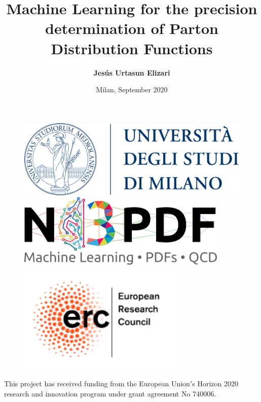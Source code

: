 \documentclass[aspectratio=43]{beamer}
\title[GP for theory uncertainties]{Machine Learning for the precision determination of Parton Distribution Functions}
\author{\textbf {Jes\'us Urtasun Elizari}}
\date{Milan, September 2020}
\begin{document}
\begin{frame}

	\vspace{1.0 cm}
	
	
	\vspace{0.25 cm}

	\begin{figure}
		\includegraphics[width = 3.0 cm]{plots/unimi.png}
		\hfill
		\includegraphics[width = 3.0 cm]{plots/n3pdf.png}
		\hfill
		\includegraphics[width = 3.0 cm]{plots/erc.png}
		\endminipage
	\end{figure}

	\vspace{1.0 cm}
	
	{\scriptsize \color{blue} This project has received funding from the European Union$'$s Horizon 2020 research and innovation program under grant agreement No 740006.}

\end{frame}
\end{document}
